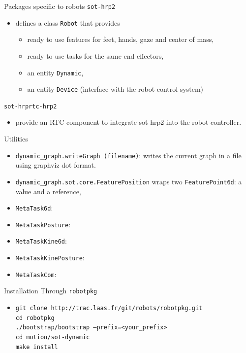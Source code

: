 %
%
\begin{frame} {Packages specific to robots}
  \texttt{sot-hrp2}
  \begin{itemize}
  \item defines a class \texttt{Robot} that provides
    \begin{itemize}
      \item ready to use features for feet, hands, gaze and center of mass,
      \item ready to use tasks for the same end effectors,
      \item an entity \texttt{Dynamic},
      \item an entity \texttt{Device} (interface with the robot control system)
    \end{itemize}
  \end{itemize}
  \texttt {sot-hrprtc-hrp2}
  \begin{itemize}
  \item provide an RTC component to integrate sot-hrp2 into the robot controller.
  \end{itemize}
\end{frame}

%
%
\begin {frame} {Utilities}
  \begin{itemize}
  \item \texttt{dynamic\_graph.writeGraph (filename)}: writes the current graph in a file using graphviz dot format.
    \pause
  \item \texttt {dynamic\_graph.sot.core.FeaturePosition} wraps two \texttt{FeaturePoint6d}: a value and a reference,
    \pause
  \item \texttt{MetaTask6d}:
    \pause
  \item \texttt{MetaTaskPosture}:
    \pause
  \item \texttt{MetaTaskKine6d}:
    \pause
  \item \texttt{MetaTaskKinePosture}:
    \pause
  \item \texttt{MetaTaskCom}:
  \end{itemize}
\end{frame}

%
%

\begin{frame} {Installation}
  Through \texttt {robotpkg}
  \begin{itemize}
  \item \texttt {\tiny git clone http://trac.laas.fr/git/robots/robotpkg.git\\
    cd robotpkg\\
    ./bootstrap/bootstrap --prefix=<your\_prefix>\\
    cd motion/sot-dynamic\\
    make install}
  \end{itemize}
\end{frame}

